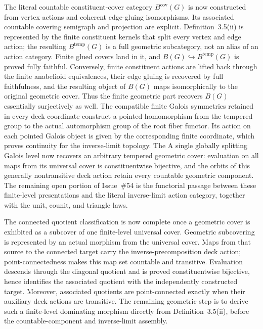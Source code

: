 \begin{definition}
  The literal countable constituent-cover category $B^{\mathrm{cov}}(G)$ is
  now constructed from vertex actions and coherent edge-gluing isomorphisms.
  Its associated countable covering semigraph and projection are explicit.
  Definition~3.5(ii) is represented by the finite constituent kernels that
  split every vertex and edge action; the resulting $B^{\mathrm{temp}}(G)$ is
  a full geometric subcategory, not an alias of an action category.  Finite
  glued covers land in it, and $B(G)\hookrightarrow B^{\mathrm{temp}}(G)$ is
  proved fully faithful.  Conversely, finite constituent actions are lifted
  back through the finite anabelioid equivalences, their edge gluing is
  recovered by full faithfulness, and the resulting object of $B(G)$ maps
  isomorphically to the original geometric cover.  Thus the finite geometric
  part recovers $B(G)$ essentially surjectively as well.  The compatible
  finite Galois symmetries retained in
  every deck coordinate construct a pointed homomorphism from the tempered
  group to the actual automorphism group of the root fiber functor.  Its
  action on each pointed Galois object is given by the corresponding finite
  coordinate, which proves continuity for the inverse-limit topology.  The
  A single globally splitting Galois level now recovers an arbitrary tempered
  geometric cover: evaluation on all maps from its universal cover is
  constituentwise bijective, and the orbits of this generally nontransitive
  deck action retain every countable geometric component.  The remaining
  open portion of Issue~\#54 is the functorial passage between these
  finite-level presentations and the literal inverse-limit action category,
  together with the unit, counit, and triangle laws.

  The connected quotient classification is now complete once a geometric
  cover is exhibited as a subcover of one finite-level universal cover.
  Geometric subcovering is represented by an actual morphism from the
  universal cover.  Maps from that source to the connected target carry the
  inverse-precomposition deck action; point-connectedness makes this map set
  countable and transitive.  Evaluation descends through the diagonal
  quotient and is proved constituentwise bijective, hence identifies the
  associated quotient with the independently constructed target.  Moreover,
  associated quotients are point-connected exactly when their auxiliary deck
  actions are transitive.  The remaining geometric step is to derive such a
  finite-level dominating morphism directly from Definition~3.5(ii), before
  the countable-component and inverse-limit assembly.


\end{definition}
